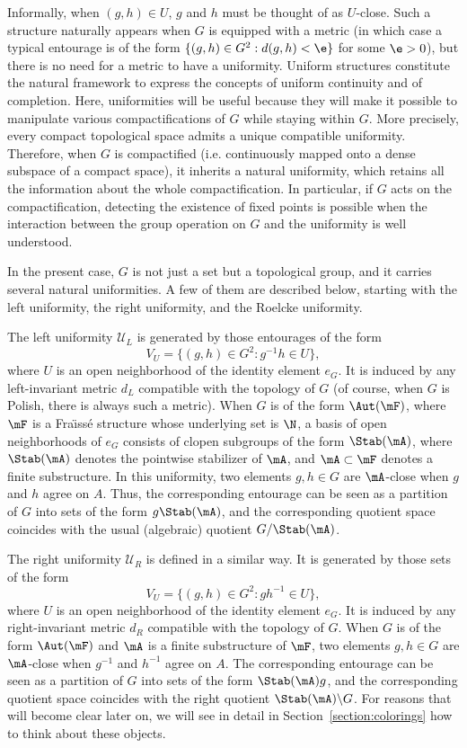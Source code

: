 Informally, when $(g,h)\in U$, $g$ and $h$ must be thought of as $U$-close. Such a structure naturally appears when $G$ is equipped with a metric (in which case a typical entourage is of the form $\{ (g,h) \in G^{2}: d(g,h)<\e\}$ for some $\e>0$), but there is no need for a metric to have a uniformity. Uniform structures constitute the natural framework to express the concepts of uniform continuity and of completion. Here, uniformities will be useful because they will make it possible to manipulate various compactifications of $G$ while staying within $G$. More precisely, every compact topological space admits a unique compatible uniformity. Therefore, when $G$ is compactified (i.e. continuously mapped onto a dense subspace of a compact space), it inherits a natural uniformity, which retains all the information about the whole compactification. In particular, if $G$ acts on the compactification, detecting the existence of fixed points is possible when the interaction between the group operation on $G$ and the uniformity is well understood.

In the present case, $G$ is not just a set but a topological group, and it carries several natural uniformities. A few of them are described below, starting with the left uniformity, the right uniformity, and the Roelcke uniformity.

The left uniformity $\mathcal U_{L}$ is generated by those entourages of the form
\[
V_{U}=\{ (g,h)\in G^{2}: g^{-1}h\in U\},
\]
where $U$ is an open neighborhood of the identity element $e_{G}$. It is induced by any left-invariant metric $d_{L}$ compatible with the topology of $G$ (of course, when $G$ is Polish, there is always such a metric). When $G$ is of the form $\Aut(\mF)$, where $\mF$ is a Fra\"{\i}ss\'e structure whose underlying set is $\N$, a basis of open neighborhoods of $e_{G}$ consists of clopen subgroups of the form $\Stab(\mA)$, where $\Stab(\mA)$ denotes the pointwise stabilizer of $\mA$, and $\mA\subset \mF$ denotes a finite substructure. In this uniformity, two elements $g, h\in G$ are $\mA$-close when $g$ and $h$ agree on $A$. Thus, the corresponding entourage can be seen as a partition of $G$ into sets of the form $g\Stab(\mA)$, and the corresponding quotient space coincides with the usual (algebraic) quotient $G/\Stab(\mA)$.

The right uniformity $\mathcal U_{R}$ is defined in a similar way. It is generated by those sets of the form
\[
V_{U}=\{ (g,h)\in G^{2}: gh^{-1}\in U\},
\]
where $U$ is an open neighborhood of the identity element $e_{G}$. It is induced by any right-invariant metric $d_{R}$ compatible with the topology of $G$. When $G$ is of the form $\Aut(\mF)$ and $\mA$ is a finite substructure of $\mF$, two elements $g, h\in G$ are $\mA$-close when $g^{-1}$ and $h^{-1}$ agree on $A$. The corresponding entourage can be seen as a partition of $G$ into sets of the form $\Stab(\mA)g$, and the corresponding quotient space coincides with the right quotient $\Stab(\mA)\backslash G$. For reasons that will become clear later on, we will see in detail in Section~\ref{section:colorings} how to think about these objects.

